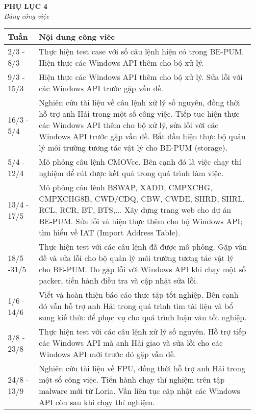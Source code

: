 \begin{center}
	\begin{huge}
			\textbf{PHỤ LỤC 4}\\
			\textit{Bảng công việc}
	\end{huge}
\end{center}

	\begin{longtable}{|l|m{11cm}|}
		\hline
			Tuần & Nội dung công viêc \\
		\hline
		\hline
			2/3 - 8/3	& Thực hiện test case với số câu lệnh hiện có trong BE-PUM. Hiện thực các Windows API thêm cho bộ xử lý.\\
		\hline
			9/3 - 15/3	& Hiện thực các Windows API thêm cho bộ xử lý. Sửa lỗi với các Windows API trước gặp vấn đề.\\
		\hline	
			16/3 - 5/4&	Nghiên cứu tài liệu về câu lệnh xử lý số nguyên, đồng thời hỗ trợ anh Hải trong một số công việc. Tiếp tục hiện thực các Windows API thêm cho bộ xử lý, sửa lỗi với các Windows API trước gặp vấn đề. Bắt đầu hiện thực bộ quản lý môi trường tương tác vật lý cho BE-PUM (storage).\\
		\hline	
			5/4 - 12/4&	Mô phỏng câu lệnh CMOVcc. Bên cạnh đó là việc chạy thí nghiệm để rút được kết quả trong quá trình làm việc.\\
		\hline	
			13/4 - 17/5	&Mô phỏng câu lênh  BSWAP, XADD, CMPXCHG, CMPXCHG8B, CWD/CDQ, CBW, CWDE, SHRD, SHRL, RCL, RCR,  BT, BTS,... Xây dựng trang web cho dự án BE-PUM. Sửa lỗi và hiện thực thêm cho bộ Windows API; tìm hiểu về IAT (Import Address Table).\\		
		\hline	
			18/5 -31/5	&Thực hiện test với các câu lệnh đã được mô phỏng. Gặp vấn đề và sửa lỗi cho bộ quản lý môi trường tương tác vật lý cho BE-PUM. Do gặp lỗi với Windows API khi chạy một số packer, tiến hành điều tra và cập nhật sửa lỗi.\\
		\hline	
			1/6 - 14/6	& Viết và hoàn thiện báo cáo thực tập tốt nghiệp. Bên cạnh đó vẫn hỗ trợ anh Hải trong quá trình tìm tài liệu và bổ sung kiế thức để phục vụ cho quá trình luận văn tốt nghiệp.\\	
		\hline	
			3/8 - 23/8&	Thực hiện test với các câu lệnh xử lý số nguyên. Hỗ trợ tiếp các Windows API mà anh Hải giao và sửa lỗi cho các Windows API mới trước đó gặp vấn đề.\\
		\hline	
			24/8 - 13/9&	Nghiên cứu tài liệu về FPU, đồng thời hỗ trợ anh Hải trong một số công việc. Tiến hành chạy thí nghiệm trên tập malware mới từ Loria. Vấn liên tục cập nhật các Windows API còn sau khi chạy thí nghiệm.\\

\end{longtable}
